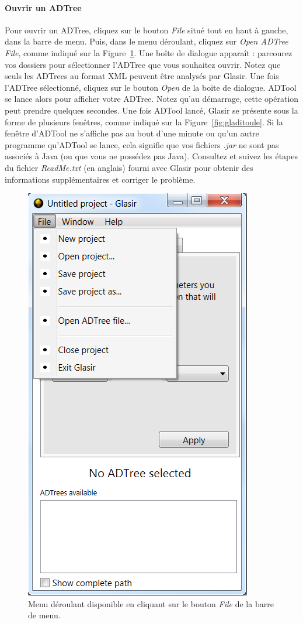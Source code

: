 \paragraph{Ouvrir un ADTree}
Pour ouvrir un ADTree, cliquez sur le bouton \emph{File} situé tout en haut à gauche, dans la barre de menu. Puis, dans le menu déroulant, cliquez sur \emph{Open ADTree File}, comme indiqué sur la {\sc Figure}~\ref{fig:file}. Une boîte de dialogue apparaît : parcourez vos dossiers pour sélectionner l'ADTree que vous souhaitez ouvrir. Notez que seuls les ADTrees au format XML  peuvent être analysés par Glasir. Une fois l'ADTree sélectionné, cliquez sur le bouton \emph{Open} de la boite de dialogue. ADTool se lance alors pour afficher votre ADTree. Notez qu'au démarrage, cette opération peut prendre quelques secondes. Une fois ADTool lancé, Glasir se présente sous la forme de plusieurs fenêtres, comme indiqué sur la {\sc Figure}~\ref{fig:gladitoule}. Si la fenêtre d'ADTool ne s'affiche pas au bout d'une minute ou qu'un autre programme qu'ADTool se lance, cela signifie que vos fichiers \emph{.jar} ne sont pas associés à Java (ou que vous ne possédez pas Java). Consultez et suivez les étapes du fichier \emph{ReadMe.txt} (en anglais) fourni avec Glasir pour obtenir des informations supplémentaires et corriger le problème.

	\begin{figure}[H]
        \centering
        \includegraphics[height=0.7\textwidth]{figure/openfile.png}
        \caption{Menu déroulant disponible en cliquant sur le bouton \emph{File} de la barre de menu.}
        \label{fig:file}
    \end{figure}
    
